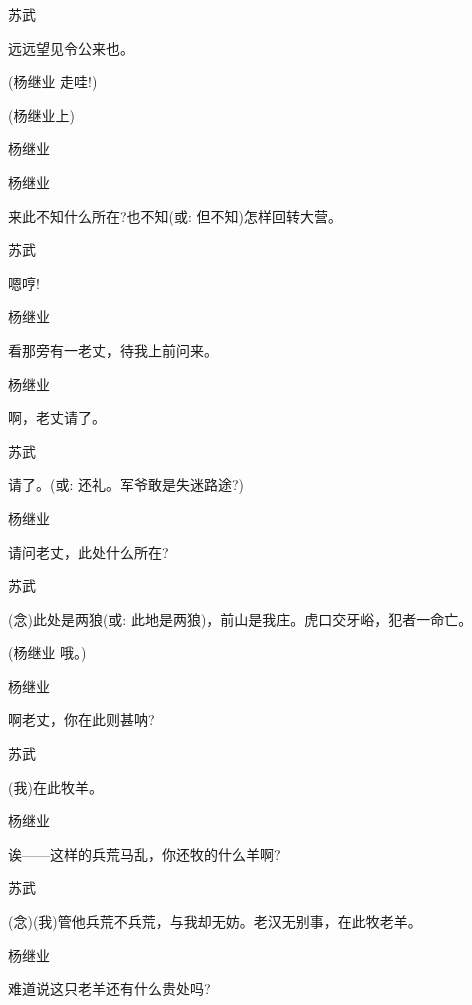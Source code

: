 {{苏武\hspace{30pt}~

远远望见令公来也。}

{(杨继业 走哇!)}

{(杨继业上)}

{杨继业

 }

{杨继业\hspace{20pt}~

来此不知什么所在?也不知({\akai 或}: 但不知)怎样回转大营。}

{苏武\hspace{30pt}~

嗯哼!}

{杨继业\hspace{20pt}~

看那旁有一老丈，待我上前问来。}

{杨继业\hspace{20pt}~

啊，老丈请了。}

{苏武\hspace{30pt}~

请了。({\akai 或}: 还礼。军爷敢是失迷路途?)}

{杨继业\hspace{20pt}~

请问老丈，此处什么所在?}

{苏武

({\akai 念})此处是两狼({\akai 或}: 此地是两狼)，前山是我庄。虎口交牙峪，犯者一命亡。}

{(杨继业 哦。)}

{杨继业\hspace{20pt}~

啊老丈，你在此则甚呐?}

{苏武\hspace{30pt}~

(我)在此牧羊。}

{杨继业\hspace{20pt}~

诶------这样的兵荒马乱，你还牧的什么羊啊?}

{苏武

({\akai 念})(我)管他兵荒不兵荒，与我却无妨。老汉无别事，在此牧老羊。}

{杨继业\hspace{20pt}~

难道说这只老羊还有什么贵处吗?}

}
